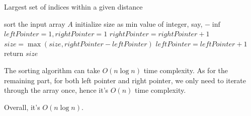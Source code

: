 
\begin{algorithm}
  \caption{Largest set of indices within a given distance}
  sort the input array $A$\;
  initialize size as min value of integer, say, $-\inf$\;
  $leftPointer = 1, rightPointer = 1$\;
  {
    {
    	$rightPointer = rightPointer + 1$\;
    }
    $size = \max(size, rightPointer-leftPointer)$\;
    $leftPointer = leftPointer +1$\;
}
    return $size$\;
\end{algorithm}



The sorting algorithm can take $O(n\log n)$ time complexity. As for the remaining part, for both left pointer and right pointer, we only need to iterate through the array once, hence it's $O(n)$ time complexity.

Overall, it's $O(n\log n)$.



